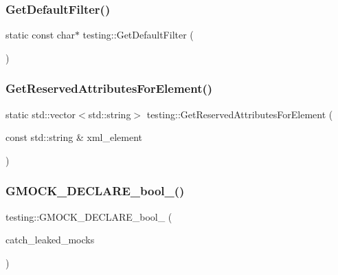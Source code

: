 \mbox{\label{namespacetesting_a56fbc164c7dc53596c23e519d8f1ca3c}} 
\subsubsection{\texorpdfstring{GetDefaultFilter()}{GetDefaultFilter()}}
{\footnotesize\ttfamily static const char$\ast$ testing\+::\+Get\+Default\+Filter (\begin{DoxyParamCaption}{ }\end{DoxyParamCaption})\hspace{0.3cm}{\ttfamily [static]}}

\mbox{\label{namespacetesting_acb3fdfadf475a3c2f5e22a3dae73532a}} 
\subsubsection{\texorpdfstring{GetReservedAttributesForElement()}{GetReservedAttributesForElement()}}
{\footnotesize\ttfamily static std\+::vector$<$std\+::string$>$ testing\+::\+Get\+Reserved\+Attributes\+For\+Element (\begin{DoxyParamCaption}\item[{const std\+::string \&}]{xml\+\_\+element }\end{DoxyParamCaption})\hspace{0.3cm}{\ttfamily [static]}}

\mbox{\label{namespacetesting_a9dd7591091234b86ce48ce1aff6feeb5}} 
\subsubsection{\texorpdfstring{GMOCK\_DECLARE\_bool\_()}{GMOCK\_DECLARE\_bool\_()}}
{\footnotesize\ttfamily testing\+::\+G\+M\+O\+C\+K\+\_\+\+D\+E\+C\+L\+A\+R\+E\+\_\+bool\+\_\+ (\begin{DoxyParamCaption}\item[{catch\+\_\+leaked\+\_\+mocks}]{ }\end{DoxyParamCaption})}

